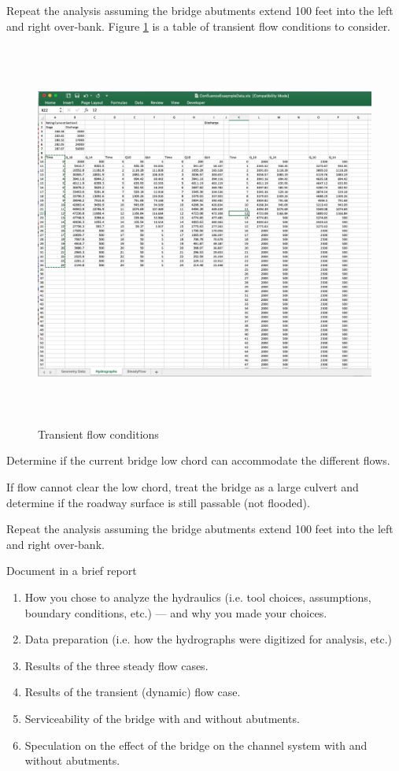 \documentclass[12pt]{article}
\begin{document}
Repeat the analysis assuming the bridge abutments extend 100 feet into the left and right over-bank.
\clearpage
Figure \ref{fig:hydrographs-table} is a table of transient flow conditions to consider. 
\begin{figure}[h!] %
   \centering
   \includegraphics[height=5in]{hydrographs-table.png} 
   \caption{Transient flow conditions }
   \label{fig:hydrographs-table}
\end{figure}
\newline
Determine if the current bridge low chord can accommodate the different flows.  


If flow cannot clear the low chord, treat the bridge as a large culvert and determine if the roadway surface is still passable (not flooded).

Repeat the analysis assuming the bridge abutments extend 100 feet into the left and right over-bank.

Document in a brief report
\begin{enumerate}

\item How you chose to analyze the hydraulics (i.e. tool choices, assumptions, boundary conditions, etc.) --- and why you made your choices.
\item Data preparation (i.e. how the hydrographs were digitized for analysis, etc.)
\item Results of the three steady flow cases.
\item Results of the transient (dynamic) flow case.
\item Serviceability of the bridge with and without abutments.
\item Speculation on the effect of the bridge on the channel system with and without abutments.

\end{enumerate}


\end{document}
